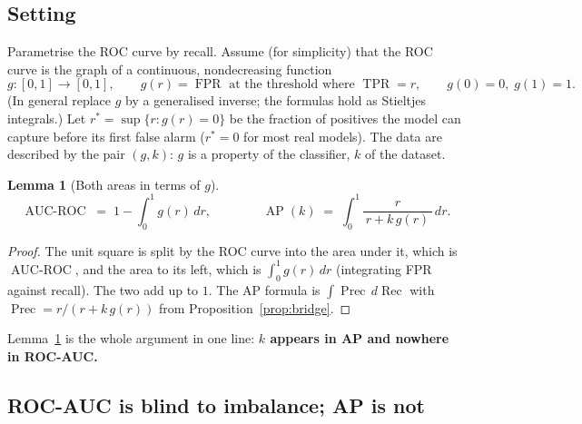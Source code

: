 \documentclass[11pt,a4paper]{article}
\DeclareMathOperator{\TPR}{TPR}
\DeclareMathOperator{\FPR}{FPR}
\DeclareMathOperator{\Prec}{Prec}
\DeclareMathOperator{\Rec}{Rec}
\DeclareMathOperator{\AUROC}{AUC\text{-}ROC}
\DeclareMathOperator{\AP}{AP}
\theoremstyle{plain}
\newtheorem{lemma}[theorem]{Lemma}
\theoremstyle{definition}
\theoremstyle{remark}
\begin{document}
\subsection{Setting}
Parametrise the ROC curve by recall. Assume (for simplicity) that the ROC curve is the graph of a
continuous, nondecreasing function
\[
  g:[0,1]\to[0,1],\qquad g(r)=\FPR \text{ at the threshold where } \TPR=r,\qquad g(0)=0,\; g(1)=1 .
\]
(In general replace $g$ by a generalised inverse; the formulas hold as Stieltjes integrals.) Let
$r^{*}=\sup\{r:g(r)=0\}$ be the fraction of positives the model can capture before its first false alarm
($r^{*}=0$ for most real models). The data are described by the pair $(g,k)$: $g$ is a property of
the classifier, $k$ of the dataset.

\begin{lemma}[Both areas in terms of $g$]\label{lem:areas}
\[
  \AUROC \;=\; 1-\int_0^1 g(r)\,dr,
  \qquad\qquad
  \AP(k) \;=\; \int_0^1 \frac{r}{\,r+k\,g(r)\,}\,dr .
\]
\end{lemma}
\begin{proof}
The unit square is split by the ROC curve into the area under it, which is $\AUROC$, and the area to
its left, which is $\int_0^1 g(r)\,dr$ (integrating FPR against recall). The two add up to $1$. The AP
formula is $\int \Prec\,d\Rec$ with $\Prec=r/(r+k\,g(r))$ from Proposition~\ref{prop:bridge}.
\end{proof}

Lemma~\ref{lem:areas} is the whole argument in one line: \textbf{$k$ appears in AP and nowhere in
ROC-AUC.}

\subsection{ROC-AUC is blind to imbalance; AP is not}
\end{document}
